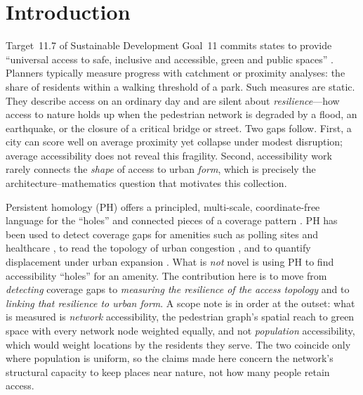 \section{Introduction}
Target~11.7 of Sustainable Development Goal~11 commits states to provide
``universal access to safe, inclusive and accessible, green and public spaces''
\citep{un2015sdg}. Planners typically measure progress with catchment or
proximity analyses: the share of residents within a walking threshold of a park.
Such measures are static. They describe access on an ordinary day and are silent
about \emph{resilience}---how access to nature holds up when the pedestrian
network is degraded by a flood, an earthquake, or the closure of a critical
bridge or street. Two gaps follow. First, a city can score well on average
proximity yet collapse under modest disruption; average accessibility does not
reveal this fragility. Second, accessibility work rarely connects the
\emph{shape} of access to urban \emph{form}, which is precisely the
architecture--mathematics question that motivates this collection.

Persistent homology (PH) offers a principled, multi-scale, coordinate-free
language for the ``holes'' and connected pieces of a coverage pattern
\citep{otter2017roadmap,feng2021tda}. PH has been used to detect coverage gaps
for amenities such as polling sites \citep{hickok2022polling} and healthcare
\citep{gonzalez2025healthcare}, to read the topology of urban congestion
\citep{wu2017congestion}, and to quantify displacement under urban expansion
\citep{rodriguez2025displacement}. What is \emph{not} novel is using PH to find
accessibility ``holes'' for an amenity. The contribution here is to move from
\emph{detecting} coverage gaps to \emph{measuring the resilience of the access
topology} and to \emph{linking that resilience to urban form}. A scope note is in
order at the outset: what is measured is \emph{network} accessibility, the pedestrian
graph's spatial reach to green space with every network node weighted equally, and
not \emph{population} accessibility, which would weight locations by the residents
they serve. The two coincide only where population is uniform, so the claims made
here concern the network's structural capacity to keep places near nature, not how
many people retain access.

